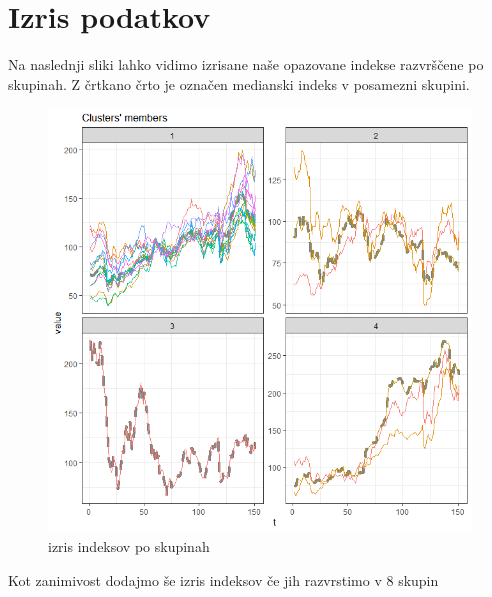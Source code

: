 \documentclass[12pt,a4paper]{article}
\begin{document}
\section{Izris podatkov}

Na naslednji sliki lahko vidimo izrisane naše opazovane indekse razvrščene po skupinah.
Z črtkano črto je označen medianski indeks v posamezni skupini.\\
\begin{figure}[h!]
    \centering
    \includegraphics[scale=0.60]{slike/4_skupine.png}
    \caption{izris indeksov po skupinah}
\end{figure}

\pagebreak
Kot zanimivost dodajmo še izris indeksov če jih razvrstimo v 8 skupin
\end{document}
